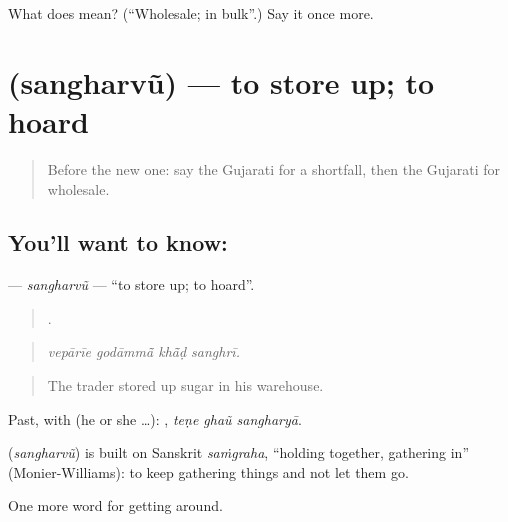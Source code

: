 \begin{tcolorbox}[breakable,colback=teal!4,colframe=teal!35!black,title={Before you move on}]
What does  mean? (\textquotedblleft{}Wholesale; in bulk\textquotedblright{}.) Say it once more.
\end{tcolorbox}
\section[\texorpdfstring{\gu{સંઘરવું} (sangharvũ)}{સંઘરવું (sangharvũ)}]{ (sangharvũ) — to store up; to hoard}

\label{lesson:GU-C431-sangharvu}



\begin{quote}
Before the new one: say the Gujarati for a shortfall, then the Gujarati for wholesale.
\end{quote}

\subsection*{You'll want to know: }
\textbf{} — \emph{sangharvũ} — \textquotedblleft{}to store up; to hoard\textquotedblright{}.

\begin{quote}
   .
\end{quote}

\begin{quote}
\emph{vepārīe godāmmā̃ khā̃ḍ sanghrī.}
\end{quote}

\begin{quote}
The trader stored up sugar in his warehouse.
\end{quote}

Past, with  (he or she …):   , \emph{teṇe ghaũ sangharyā}.

\begin{cousinweb}
\textbf{} (\emph{sangharvũ}) is built on Sanskrit \emph{saṁgraha}, \textquotedblleft{}holding together, gathering in\textquotedblright{} (Monier-Williams): to keep gathering things and not let them go.
\end{cousinweb}

\begin{grammarlens}[title={What you've built}]
One more word for getting around.
\end{grammarlens}

